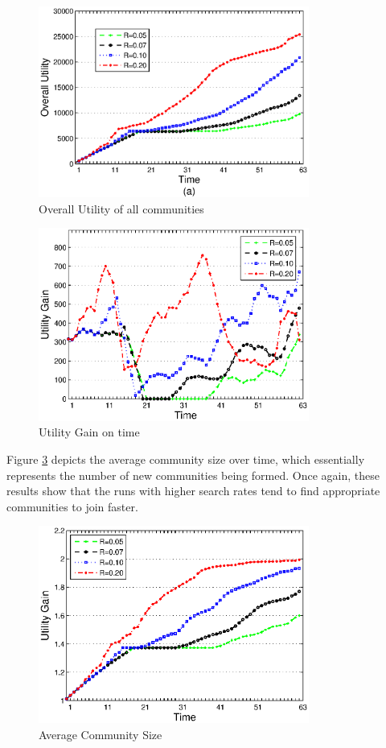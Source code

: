 \documentclass[10pt,journal,cspaper,compsoc]{IEEEtran}
\begin{document}
\begin{figure}%
\centering
\includegraphics[width=3.5in]{figures/stats1.eps}
\caption{Overall Utility of all communities}
\label{stats1}
\end{figure}


\begin{figure}%
\centering
\includegraphics[width=3.5in]{figures/stats2.eps}
\caption{Utility Gain on time}
\label{stats2}
\end{figure}

Figure \ref{stats3} depicts the average community size over time, which essentially represents the number of new communities being formed. Once again, these results show that the runs with higher search rates tend to find appropriate communities to join faster.

\begin{figure}%
\centering
\includegraphics[width=3.5in]{figures/stats3.eps}
\caption{Average Community Size}
\label{stats3}
\end{figure}
\end{document}
